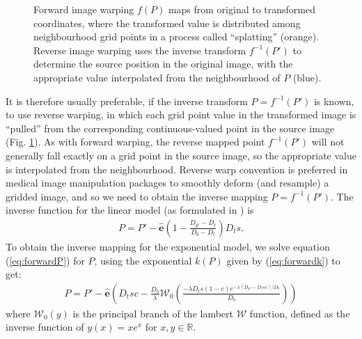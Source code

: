 \begin{figure}[h!]
  \centering
  
  \caption[Forward and reverse image warping]{Forward image warping $f(P)$ maps from original to transformed coordinates, where the transformed value is distributed among neighbourhood grid points in a process called ``splatting'' (orange). Reverse image warping uses the inverse transform $f^{-1}(P')$ to determine the source position in the original image, with the appropriate value interpolated from the neighbourhood of $P$ (blue).}
  \label{fig:warp}
\end{figure}

It is therefore usually preferable, if the inverse transform $P = f^{-1}(P')$ is known, to use reverse warping, in which each grid point value in the transformed image is ``pulled'' from the corresponding continuous-valued point in the source image (Fig. \ref{fig:warp}).
As with forward warping, the reverse mapped point $f^{-1}(P')$ will not generally fall exactly on a grid point in the source image, so the appropriate value is interpolated from the neighbourhood.
Reverse warp convention is preferred in medical image manipulation packages to smoothly deform (and resample) a gridded image, and so we need to obtain the inverse mapping $P = f^{-1}(P')$.
The inverse function for the linear model (as formulated in \textcite{Nowinski2005}) is
\begin{align}
  P = P' - \mathbf{\hat{e}}(1-\frac{D_{p'}-D_t}{D_b-D_t})D_ts.
\end{align}
To obtain the inverse mapping for the exponential model, we solve equation (\ref{eq:forwardP}) for $P$, using the exponential $k(P)$ given by (\ref{eq:forwardk}) to get:
\begin{align}
  P = P' - \mathbf{\hat{e}}(D_t s c - \frac{D_b}{\lambda}\mathcal{W}_0(\frac{-\lambda D_t s (1-c) e^{-\lambda(D_{p'}-D_tsc)/D_b}}{D_b}))
\end{align}
where $\mathcal{W}_0(y)$ is the principal branch of the lambert $\mathcal{W}$ function, defined as the inverse function of $ y(x) = xe^x $ for $x,y \in \mathbb{R}$.

